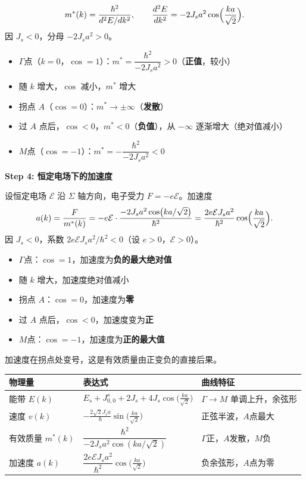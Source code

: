 \begin{derivationbox}[标准解题过程]
\begin{equation}
m^*(k)=\frac{\hbar^2}{d^2E/dk^2},\qquad
\frac{d^2E}{dk^2}=-2J_sa^2\cos\Bigl(\frac{ka}{\sqrt{2}}\Bigr).
\end{equation}
因 $J_s<0$，分母 $-2J_sa^2>0$。
\begin{itemize}
    \item $\Gamma$点（$k=0$，$\cos=1$）：$m^*=\dfrac{\hbar^2}{-2J_sa^2}>0$（\textbf{正值}，较小）
    \item 随 $k$ 增大，$\cos$ 减小，$m^*$ 增大
    \item 拐点 $A$（$\cos=0$）：$m^*\to\pm\infty$（\textbf{发散}）
    \item 过 $A$ 点后，$\cos<0$，$m^*<0$（\textbf{负值}），从 $-\infty$ 逐渐增大（绝对值减小）
    \item $M$点（$\cos=-1$）：$m^*=-\dfrac{\hbar^2}{-2J_sa^2}<0$
\end{itemize}

\textbf{Step 4: 恒定电场下的加速度}

设恒定电场 $\mathcal{E}$ 沿 $\Sigma$ 轴方向，电子受力 $F=-e\mathcal{E}$。加速度
\begin{equation}
a(k)=\frac{F}{m^*(k)}=-e\mathcal{E}\cdot\frac{-2J_sa^2\cos(ka/\sqrt{2})}{\hbar^2}
=\frac{2e\mathcal{E}J_sa^2}{\hbar^2}\cos\Bigl(\frac{ka}{\sqrt{2}}\Bigr).
\end{equation}
因 $J_s<0$，系数 $2e\mathcal{E}J_sa^2/\hbar^2<0$（设 $e>0$，$\mathcal{E}>0$）。
\begin{itemize}
    \item $\Gamma$点：$\cos=1$，加速度为\textbf{负的最大绝对值}
    \item 随 $k$ 增大，加速度绝对值减小
    \item 拐点 $A$：$\cos=0$，加速度为\textbf{零}
    \item 过 $A$ 点后，$\cos<0$，加速度变为\textbf{正}
    \item $M$点：$\cos=-1$，加速度为\textbf{正的最大值}
\end{itemize}
加速度在拐点处变号，这是有效质量由正变负的直接后果。
\end{derivationbox}

\begin{formulabox}[答案汇总]
\begin{center}
\begin{tabular}{lll}
\toprule
\textbf{物理量} & \textbf{表达式} & \textbf{曲线特征} \\
\midrule
能带 $E(k)$ & $E_s+J_{0,0}^{s}+2J_s+4J_s\cos\bigl(\frac{ka}{\sqrt{2}}\bigr)$ & $\Gamma\to M$ 单调上升，余弦形 \\
速度 $v(k)$ & $-\frac{2\sqrt{2}J_sa}{\hbar}\sin\bigl(\frac{ka}{\sqrt{2}}\bigr)$ & 正弦半波，$A$点最大 \\
有效质量 $m^*(k)$ & $\dfrac{\hbar^2}{-2J_sa^2\cos(ka/\sqrt{2})}$ & $\Gamma$正，$A$发散，$M$负 \\
加速度 $a(k)$ & $\dfrac{2e\mathcal{E}J_sa^2}{\hbar^2}\cos\bigl(\frac{ka}{\sqrt{2}}\bigr)$ & 负余弦形，$A$点为零 \\
\bottomrule
\end{tabular}
\end{center}
\end{formulabox}

